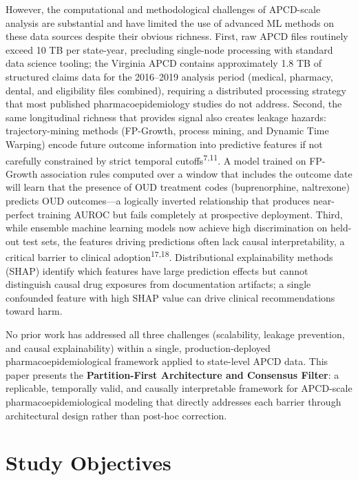 \documentclass[
  12pt,
]{book}
\begin{document}
However, the computational and methodological challenges of APCD-scale
analysis are substantial and have limited the use of advanced ML methods
on these data sources despite their obvious richness. First, raw APCD
files routinely exceed 10 TB per state-year, precluding single-node
processing with standard data science tooling; the Virginia APCD
contains approximately 1.8 TB of structured claims data for the
2016--2019 analysis period (medical, pharmacy, dental, and eligibility
files combined), requiring a distributed processing strategy that most
published pharmacoepidemiology studies do not address. Second, the same
longitudinal richness that provides signal also creates leakage hazards:
trajectory-mining methods (FP-Growth, process mining, and Dynamic Time
Warping) encode future outcome information into predictive features if
not carefully constrained by strict temporal
cutoffs\textsuperscript{7,11}. A model trained on FP-Growth association
rules computed over a window that includes the outcome date will learn
that the presence of OUD treatment codes (buprenorphine, naltrexone)
predicts OUD outcomes---a logically inverted relationship that produces
near-perfect training AUROC but fails completely at prospective
deployment. Third, while ensemble machine learning models now achieve
high discrimination on held-out test sets, the features driving
predictions often lack causal interpretability, a critical barrier to
clinical adoption\textsuperscript{17,18}. Distributional explainability
methods (SHAP) identify which features have large prediction effects but
cannot distinguish causal drug exposures from documentation artifacts; a
single confounded feature with high SHAP value can drive clinical
recommendations toward harm.

No prior work has addressed all three challenges (scalability, leakage
prevention, and causal explainability) within a single,
production-deployed pharmacoepidemiological framework applied to
state-level APCD data. This paper presents the \textbf{Partition-First
Architecture and Consensus Filter}: a replicable, temporally valid, and
causally interpretable framework for APCD-scale pharmacoepidemiological
modeling that directly addresses each barrier through architectural
design rather than post-hoc correction.

\section{Study Objectives}\label{study-objectives}
\end{document}
